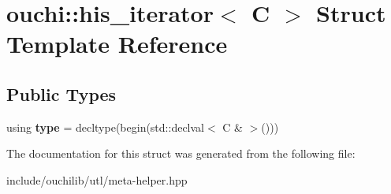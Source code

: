 \hypertarget{structouchi_1_1his__iterator}{}\section{ouchi\+::his\+\_\+iterator$<$ C $>$ Struct Template Reference}
\label{structouchi_1_1his__iterator}
\subsection*{Public Types}
\begin{DoxyCompactItemize}
\item 
\mbox{\label{structouchi_1_1his__iterator_a11e9aa48a8a03e14b79c408578ff857c}} 
using {\bfseries type} = decltype(begin(std\+::declval$<$ C \& $>$()))
\end{DoxyCompactItemize}


The documentation for this struct was generated from the following file\+:\begin{DoxyCompactItemize}
\item 
include/ouchilib/utl/meta-\/helper.\+hpp\end{DoxyCompactItemize}
